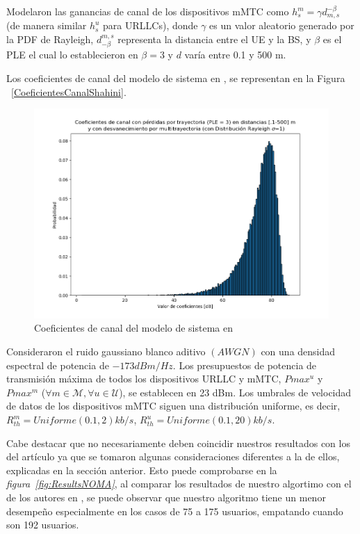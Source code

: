 Modelaron las ganancias de canal de los dispositivos mMTC como $h_{s}^{m} = \gamma d^{ -\beta}_{ m, s}$ (de manera similar $h_{s}^{u}$ para URLLCs), donde $\gamma$ es un valor aleatorio generado por la PDF de Rayleigh, $d_{-\beta}^{m,s}$ representa la distancia entre el UE y la BS, y $\beta$ es el PLE el cual lo establecieron en $\beta = 3$ y $d$ varía entre 0.1 y 500 m. \newline

Los coeficientes de canal del modelo de sistema en \parencite{Shahini2019}, se representan en la Figura ~\ref{CoeficientesCanalShahini}.

\begin{figure}[th]
    \centering
    \includegraphics[scale=.55]{Figures/CoeficientesCanalShahini}
    \decoRule
    \caption[Coeficientes de canal del modelo de sistema en \parencite{Shahini2019}]{Coeficientes de canal del modelo de sistema en \parencite{Shahini2019} }
    \label{fig:CoeficientesCanalShahini}
\end{figure}

Consideraron el ruido gaussiano blanco aditivo $(AWGN)$ con una densidad espectral de potencia de $-173 dBm / Hz$. Los presupuestos de potencia de transmisión máxima de todos los dispositivos URLLC y mMTC, $Pmax ^{u}$ y $Pmax ^{m}$ ($\forall m \in \mathcal {M} , \forall u \in \mathcal {U}$), se establecen en 23 dBm. Los umbrales de velocidad de datos de los dispositivos mMTC siguen una distribución uniforme, es decir, $R_{th}^{ m} = Uniforme (0.1, 2) kb / s$, $R_{th}^{u} = Uniforme (0.1, 20) kb / s$.\newline

Cabe destacar que no necesariamente deben coincidir nuestros resultados con los del artículo ya que se tomaron algunas consideraciones diferentes a la de ellos, explicadas en la sección anterior. Esto puede comprobarse en la \textit{figura~\ref{fig:ResultsNOMA}}, al comparar los resultados de nuestro algortimo con el de los autores en \parencite{Shahini2019}, se puede observar que nuestro algoritmo tiene un menor desempeño especialmente en los casos de 75 a 175 usuarios, empatando cuando son 192 usuarios.\newline

